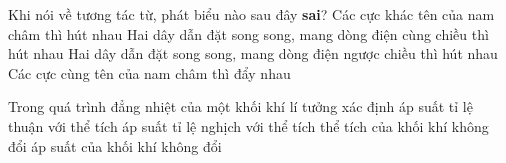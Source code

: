 	\begin{ex}%
		Khi nói về tương tác từ, phát biểu nào sau đây \textbf{sai}?
		\choice
		{Các cực khác tên của nam châm thì hút nhau}
		{Hai dây dẫn đặt song song, mang dòng điện cùng chiều thì hút nhau}
		{\True Hai dây dẫn đặt song song, mang dòng điện ngược chiều thì hút nhau}
		{Các cực cùng tên của nam châm thì đẩy nhau}
	\end{ex}

	\begin{ex}%
		Trong quá trình đẳng nhiệt của một khối khí lí tưởng xác định
		\choice
		{áp suất tỉ lệ thuận với thể tích}
		{\True áp suất tỉ lệ nghịch với thể tích}
		{thể tích của khối khí không đổi}
		{áp suất của khối khí không đổi}
	\end{ex}


